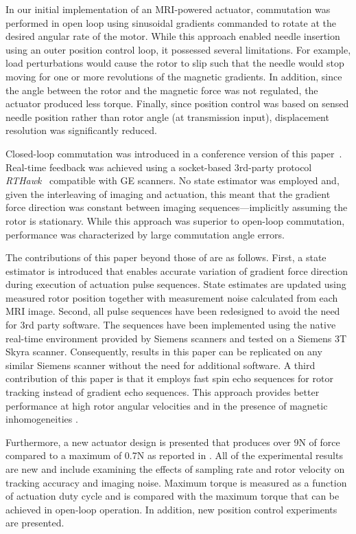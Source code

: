 \documentclass[journal]{IEEEtran}
\begin{document}
In our initial implementation of an MRI-powered actuator, commutation was performed in open loop using  sinusoidal gradients commanded to rotate at the desired angular rate of the motor\cite{vartholomeos2011mripowered,vartholomeos2013mri}. While this approach enabled needle insertion using an outer position control loop, it possessed several limitations. For example, load perturbations would cause the rotor to slip such that the needle would stop moving for one or more revolutions of the magnetic gradients. In addition, since the angle between the rotor and the magnetic force was not regulated, the actuator produced less torque. Finally, since position control was based on sensed needle position rather than rotor angle (at transmission input), displacement resolution was significantly reduced.

Closed-loop commutation was introduced in a conference version of this paper~\cite{bergeles2013closed}. Real-time feedback was achieved using a socket-based 3rd-party protocol \emph{RTHawk}~\cite{santos2004flexible} compatible with GE scanners. No state estimator was employed and, given the interleaving of imaging and actuation, this meant that the gradient force direction was constant between imaging sequences---implicitly assuming the rotor is stationary. While this approach was superior to open-loop commutation, performance was characterized by large commutation angle errors. 

The contributions of this paper beyond those of \cite{bergeles2013closed} are as follows. First, a state estimator is introduced that enables accurate variation of gradient force direction during execution of actuation pulse sequences. State estimates are updated using measured rotor position together with measurement noise calculated from each MRI image. Second, all pulse sequences have been redesigned to avoid the need for 3rd party software. The sequences have been implemented using the native real-time environment provided by Siemens scanners and tested on a Siemens 3T Skyra scanner. Consequently, results in this paper can be replicated on any similar Siemens scanner without the need for additional software. A third contribution of this paper is that it employs fast spin echo sequences for rotor tracking instead of gradient echo sequences. This approach provides better performance at high rotor angular velocities and in the presence of magnetic inhomogeneities \cite{Posse1990Susceptibility}. 

Furthermore, a new actuator design is presented that produces over 9N of force compared to a maximum of 0.7N as reported in \cite{bergeles2013closed}. All of the experimental results are new and include examining the effects of sampling rate and rotor velocity on tracking accuracy and imaging noise. Maximum torque is measured as a function of actuation duty cycle and is compared with the maximum torque that can be achieved in open-loop operation. In addition, new position control experiments are presented.
\end{document}
